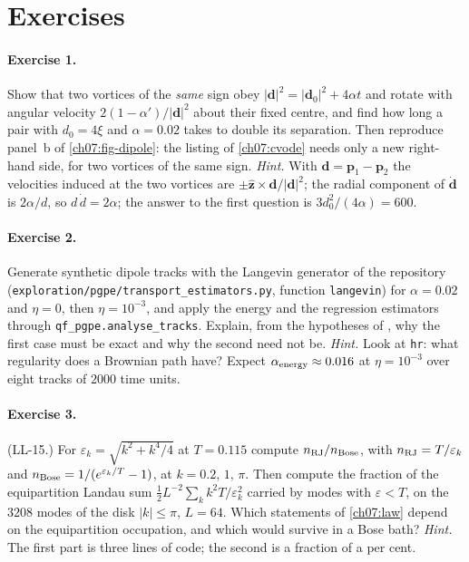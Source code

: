 \section{Exercises}

\paragraph{Exercise 1.} Show that two vortices of the \emph{same} sign obey $|\mathbf d|^2=|\mathbf d_0|^2+4\alpha t$ and rotate with angular velocity $2(1-\alpha')/|\mathbf d|^2$ about their fixed centre, and find how long a pair with $d_0=4\xi$ and $\alpha=0.02$ takes to double its separation. Then reproduce panel~b of \cref{ch07:fig-dipole}: the listing of \cref{ch07:cvode} needs only a new right-hand side, for two vortices of the same sign.
\emph{Hint.} With $\mathbf d=\mathbf p_1-\mathbf p_2$ the velocities induced at the two vortices are $\pm\hat{\mathbf z}\times\mathbf d/|\mathbf d|^2$; the radial component of $\dot{\mathbf d}$ is $2\alpha/d$, so $d\,\dot d=2\alpha$; the answer to the first question is $3d_0^2/(4\alpha)=600$.

\paragraph{Exercise 2.} Generate synthetic dipole tracks with the Langevin generator of the repository (\texttt{exploration/pgpe/transport\_estimators.py}, function \texttt{langevin}) for $\alpha=0.02$ and $\eta=0$, then $\eta=10^{-3}$, and apply the energy and the regression estimators through \texttt{qf\_pgpe.analyse\_tracks}. Explain, from the hypotheses of , why the first case must be exact and why
the second need not be. \emph{Hint.} Look at \texttt{hr}: what regularity does a Brownian path have? Expect $\alpha_{\rm energy}\approx0.016$ at $\eta=10^{-3}$ over eight tracks of $2000$ time units.

\paragraph{Exercise 3.} (LL-15.) For $\varepsilon_k=\sqrt{k^2+k^4/4}$ at $T=0.115$ compute $n_{\rm RJ}/n_{\rm Bose}$, with $n_{\rm RJ}=T/\varepsilon_k$ and $n_{\rm Bose}=1/(e^{\varepsilon_k/T}-1)$, at $k=0.2,\,1,\,\pi$. Then compute the fraction of the equipartition Landau sum $\tfrac12L^{-2}\sum_kk^2T/\varepsilon_k^2$ carried by modes with $\varepsilon<T$, on the $3208$ modes of the disk $|k|\le\pi$,
$L=64$. Which statements of \cref{ch07:law} depend on the equipartition occupation, and which would survive in a Bose bath? \emph{Hint.} The first part is three lines of code; the second is a fraction of a per cent.

